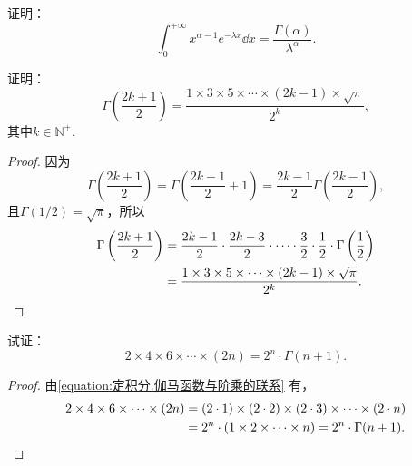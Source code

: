 \begin{example}
证明：\begin{equation}
\int_0^{+\infty} x^{\alpha-1} e^{-\lambda x} \dd{x}
= \frac{\Gamma(\alpha)}{\lambda^\alpha}.
\end{equation}
\end{example}

\begin{example}
证明：\[
\Gamma\left(\frac{2k+1}{2}\right)
= \frac{1 \times 3 \times 5 \times \dotsm \times (2k-1) \times \sqrt{\pi}}{2^k},
\]其中\(k\in\mathbb{N}^+\).
\begin{proof}
因为\[
\Gamma\left(\frac{2k+1}{2}\right)
= \Gamma\left(\frac{2k-1}{2}+1\right)
= \frac{2k-1}{2} \Gamma\left(\frac{2k-1}{2}\right),
\]且\(\Gamma(1/2) = \sqrt{\pi}\)，所以\[
\begin{split}
\Gamma\left(\frac{2k+1}{2}\right)
&= \frac{2k-1}{2} \cdot \frac{2k-3}{2} \cdot \dotsm \cdot \frac{3}{2} \cdot \frac{1}{2} \cdot \Gamma\left(\frac{1}{2}\right) \\
&= \frac{1 \times 3 \times 5 \times \dotsm \times (2k-1) \times \sqrt{\pi}}{2^k}.
\qedhere
\end{split}
\]
\end{proof}
\end{example}

\begin{example}
试证：\begin{equation}\label{equation:定积分.伽马函数与双阶乘的联系1}
2 \times 4 \times 6 \times\dotsm\times (2n) = 2^n \cdot \Gamma(n+1).
\end{equation}
\begin{proof}
由\cref{equation:定积分.伽马函数与阶乘的联系} 有，\[
\begin{split}
2 \times 4 \times 6 \times\dotsm\times (2n)
&= (2 \cdot 1) \times (2 \cdot 2) \times (2 \cdot 3) \times\dotsm\times (2 \cdot n) \\
&= 2^n \cdot (1 \times 2 \times\dotsm\times n)
= 2^n \cdot \Gamma(n+1).
\qedhere
\end{split}
\]
\end{proof}
\end{example}


